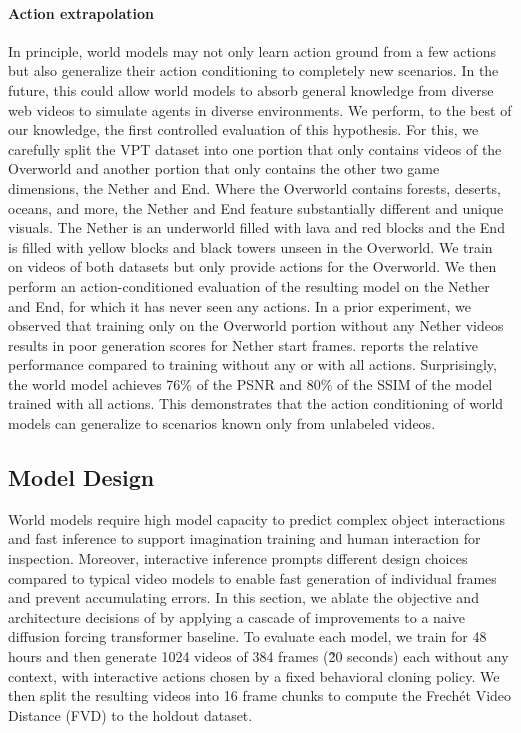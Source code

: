 \documentclass[11pt]{article}
\begin{document}
\paragraph{Action extrapolation}

In principle, world models may not only learn action ground from a few actions but also generalize their action conditioning to completely new scenarios.
In the future, this could allow world models to absorb general knowledge from diverse web videos to simulate agents in diverse environments.
We perform, to the best of our knowledge, the first controlled evaluation of this hypothesis.
For this, we carefully split the VPT dataset into one portion that only contains videos of the Overworld and another portion that only contains the other two game dimensions, the Nether and End.
Where the Overworld contains forests, deserts, oceans, and more, the Nether and End feature substantially different and unique visuals.
The Nether is an underworld filled with lava and red blocks and the End is filled with yellow blocks and black towers unseen in the Overworld.
We train \method on videos of both datasets but only provide actions for the Overworld.
We then perform an action-conditioned evaluation of the resulting model on the Nether and End, for which it has never seen any actions.
In a prior experiment, we observed that training only on the Overworld portion without any Nether videos results in poor generation scores for Nether start frames.
 reports the relative performance compared to training without any or with all actions.
Surprisingly, the world model achieves 76\% of the PSNR and 80\% of the SSIM of the model trained with all actions.
This demonstrates that the action conditioning of world models can generalize to scenarios known only from unlabeled videos.

\subsection{Model Design}
\label{sec:modeldesign}



World models require high model capacity to predict complex object interactions and fast inference to support imagination training and human interaction for inspection.
Moreover, interactive inference prompts different design choices compared to typical video models to enable fast generation of individual frames and prevent accumulating errors.
In this section, we ablate the objective and architecture decisions of \method by applying a cascade of improvements to a naive diffusion forcing transformer baseline.
To evaluate each model, we train for 48 hours and then generate 1024 videos of 384 frames (\~20 seconds) each without any context, with interactive actions chosen by a fixed behavioral cloning policy.
We then split the resulting videos into 16 frame chunks to compute the Frech\'et Video Distance (FVD) \citep{fvd} to the holdout dataset.
\end{document}
